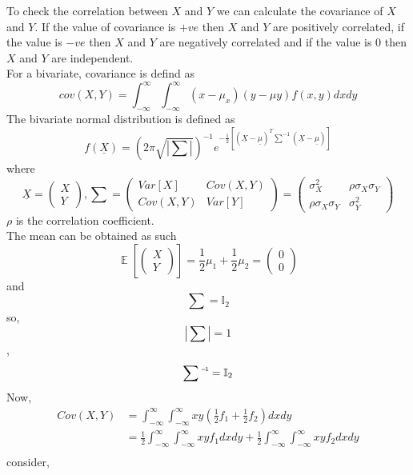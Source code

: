 \documentclass{article}
\newcommand\inv[1]{#1\raisebox{1.15ex}{$\scriptscriptstyle-\!1$}}
\theoremstyle{remark}
\renewcommand{\vec}[1]{\underline{#1}}
\begin{document}
To check the correlation between $X$ and $Y$ we can calculate the covariance of $X$ and $Y$. If the value of covariance is $+ve$ then $ X$ and $Y$ are positively correlated, if the value is $-ve$ then $X$ and $Y$ are negatively correlated and if the value is 0 then $X$ and $Y$ are independent.\\
\newline
For a bivariate, covariance is defind as \\
\[ cov(X,Y) = \int_{-\infty}^{\infty} \int_{-\infty}^{\infty} (x-\mu_{x}) (y-\mu{y}) f(x,y) dx dy \]
The bivariate normal distribution is defined as
\[
f(\vec{X}) = \left ( 2\pi\sqrt{\left | \sum \right |} \right )^{-1} e^{-\frac{1}{2}[(\vec{X}-\vec{\mu})^T\sum^{-1}(\vec{X}-\vec{\mu})]} \]
where
\[ 
\vec{X} = \begin{pmatrix}
X\\ 
Y
\end{pmatrix}, 
\sum =  \begin{pmatrix}
 Var[X]& Cov(X,Y)\\ 
 Cov(X,Y)& Var[Y] 
\end{pmatrix} = \begin{pmatrix}
\sigma_X^2  & \rho \sigma_X \sigma_Y\\ 
\rho \sigma_X \sigma_Y & \sigma_Y^2
\end{pmatrix}
\]
$\rho$ is the correlation coefficient.\\
\newline
The mean can be obtained as such
\[ \mathop{\mathbb{E}}\left[\begin{pmatrix} X\\ Y \end{pmatrix} \right ]= \frac{1}{2} \mu_{1} + \frac{1}{2} \mu_{2} = \begin{pmatrix} 0\\0 \end{pmatrix}\]
and 
\[
    \sum = \mathbb{I}_2
\]
so, \[\left | \sum \right | = 1\], \[ \inv{\sum} = \mathbb{I}_2 \]
Now,
\begin{align*}
    Cov(X,Y) &=  \int_{-\infty}^{\infty} \int_{-\infty}^{\infty} x y (\frac{1}{2}f_1+\frac{1}{2}f_2) dx dy \\
    &= \frac{1}{2} \int_{-\infty}^{\infty} \int_{-\infty}^{\infty} x y f_1 dx dy + \frac{1}{2} \int_{-\infty}^{\infty} \int_{-\infty}^{\infty} x y f_2 dx dy \\
\end{align*}
consider,
\end{document}
